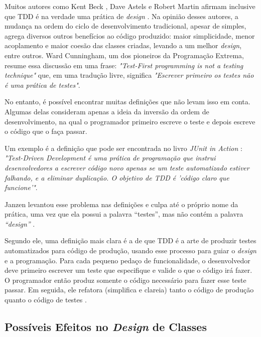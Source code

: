 Muitos autores como Kent Beck \cite{aim-fire}, Dave Astels \cite{astels-tdd} e
Robert Martin \cite{bob-martin} afirmam inclusive que TDD é na verdade uma prática de
\textit{design} \cite{tdd-taxonomy} \cite{aim-fire}.
Na opinião desses autores, a mudança na ordem do ciclo de
desenvolvimento tradicional, apesar de simples, agrega diversos outros
benefícios ao código produzido: maior simplicidade, menor acoplamento e maior
coesão das classes criadas, levando a um melhor \textit{design}, entre
outros. Ward Cunningham, um dos pioneiros da Programação Extrema, resume essa 
discussão em uma frase: \textit{"Test-First programming is not a testing technique"} 
que, em uma tradução livre, significa \textit{"Escrever primeiro os testes
não é uma prática de testes"}.

No entanto, é possível encontrar muitas definições que
não levam isso em conta. Algumas delas consideram apenas a ideia da
inversão da ordem de desenvolvimento, na qual o programador primeiro
escreve o teste e depois escreve o código que o faça passar.

Um exemplo é a definição que pode ser encontrada no livro \textit{JUnit
in Action} \cite{junit-in-action}: \textit{"Test-Driven Development é uma
prática de programação que instrui desenvolvedores a escrever código novo
apenas se um teste automatizado estiver falhando, e a eliminar duplicação. O
objetivo de TDD é 'código claro que funcione'"}.

Janzen levantou esse problema nas definições e culpa até o próprio nome da prática, uma vez
que ela possui a palavra ``testes'', mas não contém a palavra \textit{``design''} 
\cite{tdd-really-improve}.

Segundo ele, uma definição mais clara é a de que TDD é a arte de produzir testes
automatizados para código de produção, usando esse processo para guiar o \textit{design} e a programação.
Para cada pequeno pedaço de funcionalidade, o desenvolvedor deve primeiro
escrever um teste que especifique e valide o que o código irá fazer. O
programador então produz somente o código necessário para fazer esse teste
passar. Em seguida, ele refatora (simplifica e clareia) tanto o código de produção
quanto o código de testes \cite{agilealliance-tdd} \cite{tdd-taxonomy}.

\subsection{Possíveis Efeitos no \textit{Design} de Classes}


